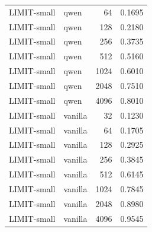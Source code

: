 \begin{tabular}{llrr}
LIMIT-small & qwen & 64 & 0.1695 \\
LIMIT-small & qwen & 128 & 0.2180 \\
LIMIT-small & qwen & 256 & 0.3735 \\
LIMIT-small & qwen & 512 & 0.5160 \\
LIMIT-small & qwen & 1024 & 0.6010 \\
LIMIT-small & qwen & 2048 & 0.7510 \\
LIMIT-small & qwen & 4096 & 0.8010 \\
LIMIT-small & vanilla & 32 & 0.1230 \\
LIMIT-small & vanilla & 64 & 0.1705 \\
LIMIT-small & vanilla & 128 & 0.2925 \\
LIMIT-small & vanilla & 256 & 0.3845 \\
LIMIT-small & vanilla & 512 & 0.6145 \\
LIMIT-small & vanilla & 1024 & 0.7845 \\
LIMIT-small & vanilla & 2048 & 0.8980 \\
LIMIT-small & vanilla & 4096 & 0.9545 \\
\bottomrule
\end{tabular}

